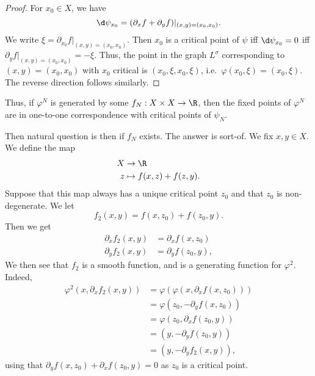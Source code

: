 \documentclass[a4paper]{article}
\begin{document}
\begin{proof}
  For $x_0 \in X$, we have
  \[
    \d \psi_{x_0} = (\partial_x f + \partial_y f)|_{(x, y) = (x_0, x_0)}.
  \]
  We write $\xi = \partial_{x_0} f|_{(x, y) = (x_0, x_0)}$. Then $x_0$ is a critical point of $\psi$ iff $\d \psi_{x_0} = 0$ iff $\partial_y f|_{(x, y) = (x_0, x_0)} = - \xi$. Thus, the point in the graph $L^\sigma$ corresponding to $(x, y) = (x_0, x_0)$ with $x_0$ critical is $(x_0, \xi, x_0, \xi)$, i.e.\ $\varphi(x_0, \xi) = (x_0, \xi)$. The reverse direction follows similarly. %
\end{proof}

Thus, if $\varphi^N$ is generated by some $f_N: X \times X \to \R$, then the fixed points of $\varphi^N$ are in one-to-one correspondence with critical points of $\psi_N$.

Then natural question is then if $f_N$ exists. The answer is sort-of. We fix $x, y \in X$. We define the map
\begin{align*}
  X &\to \R\\
  z &\mapsto f(x, z) + f(z, y).
\end{align*}
Suppose that this map always has a unique critical point $z_0$ and that $z_0$ is non-degenerate. We let
\[
  f_2(x, y) = f(x, z_0) + f(z_0, y).
\]
Then we get
\begin{align*}
  \partial_x f_2(x, y) &= \partial_x f(x, z_0)\\
  \partial_y f_2(x, y) &= \partial_y f(z_0, y),
\end{align*}
We then see that $f_2$ is a smooth function, and is a generating function for $\varphi^2$. Indeed,
\begin{align*}
  \varphi^2(x, \partial_x f_2(x, y)) &= \varphi(\varphi(x, \partial_x f(x, z_0)))\\
  &= \varphi(z_0, -\partial_y f(x, z_0))\\
  &= \varphi(z_0, \partial_x f(z_0, y))\\
  &= (y, -\partial_y f(z_0, y))\\
  &= (y, -\partial_y f_2(x, y)),
\end{align*}
using that $\partial_y f(x, z_0) + \partial_x f(z_0, y) = 0$ as $z_0$ is a critical point.
\end{document}
